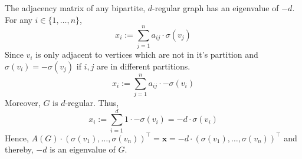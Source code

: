 \documentclass[a4paper]{article}
\begin{document}
\begin{solution}{32}
\begin{theorem}{The adjacency matrix of any bipartite, $d$-regular graph has an eigenvalue of $-d$.}
For any $i \in \{1, \dots, n\}$,
\begin{equation*}
	x_i := \sum_{j=1}^n a_{ij} \cdot \sigma(v_j)
\end{equation*}
Since $v_i$ is only adjacent to vertices which are not in it's partition and $\sigma(v_i) = -\sigma(v_j)$ if $i, j$ are in different partitions.
\begin{equation*}
	x_i := \sum_{j=1}^n a_{ij} \cdot -\sigma(v_i)
\end{equation*}
Moreover, $G$ is $d$-regular. Thus,
\begin{equation*}
	x_i :=  \sum_{i=1}^d 1 \cdot -\sigma(v_i) = -d \cdot \sigma(v_i) 
\end{equation*}
Hence, $A(G) \cdot (\sigma(v_1), \dots, \sigma(v_n))^\top = \mathbf{x} = -d \cdot (\sigma(v_1) , \dots, \sigma(v_n) )^\top$ and thereby, $-d$ is an eigenvalue of $G$.
		\end{theorem}
	\end{solution}
\end{document}
